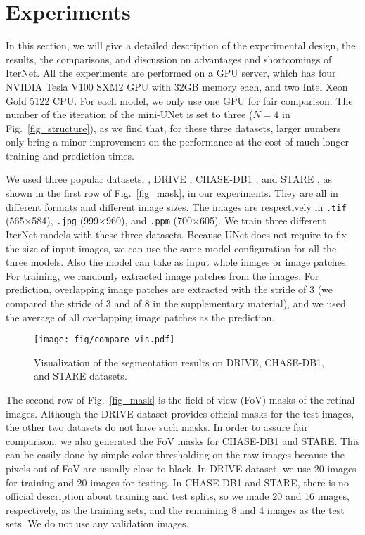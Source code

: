 \documentclass[10pt,twocolumn,letterpaper]{article}
\begin{document}
\section{Experiments}\label{section_experiment}

In this section, we will give a detailed description of the experimental design, the results, the comparisons, and discussion on advantages and shortcomings of IterNet. All the experiments are performed on a GPU server, which has four NVIDIA Tesla V100 SXM2 GPU with 32GB memory each, and two Intel Xeon Gold 5122 CPU. For each model, we only use one GPU for fair comparison. The number of the iteration of the mini-UNet is set to three ($N=4$ in Fig.~\ref{fig_structure}), as we find that, for these three datasets, larger numbers only bring a minor improvement on the performance at the cost of much longer training and prediction times.

We used three popular datasets, \ie, DRIVE \cite{staal:2004-855}, CHASE-DB1 \cite{owen2009measuring}, and STARE \cite{845178}, as shown in the first row of Fig.~\ref{fig_mask}, in our experiments. They are all in different formats and different image sizes. The images are respectively in \texttt{.tif} (565$\times$584), \texttt{.jpg} (999$\times$960), and \texttt{.ppm} (700$\times$605). We train three different IterNet models with these three datasets. Because UNet does not require to fix the size of input images, we can use the same model configuration for all the three models. Also the model can take as input whole images or image patches. For training, we randomly extracted image patches from the images. For prediction, overlapping image patches are extracted with the stride of 3 (we compared the stride of 3 and of 8 in the supplementary material), and we used the average of all overlapping image patches as the prediction.


\begin{figure*}[!t]
	\setlength{\fboxsep}{0pt}\setlength{\fboxrule}{0.2pt}

	\centering
	\texttt{[image: fig/compare\_vis.pdf]}
	\caption{Visualization of the segmentation results on DRIVE, CHASE-DB1, and STARE datasets.}
	\label{fig_vis}
\end{figure*}

The second row of Fig.~\ref{fig_mask} is the field of view (FoV) masks of the retinal images. Although the DRIVE dataset provides official masks for the test images, the other two datasets do not have such masks. In order to assure fair comparison, we also generated the FoV masks for CHASE-DB1 and STARE. This can be easily done by simple color thresholding on the raw images because the pixels out of FoV are usually close to black.
In DRIVE dataset, we use 20 images for training and 20 images for testing. In CHASE-DB1 and STARE, there is no official description about training and test splits, so we made 20 and 16 images, respectively, as the training sets, and the remaining 8 and 4 images as the test sets. We do not use any validation images.
\end{document}
